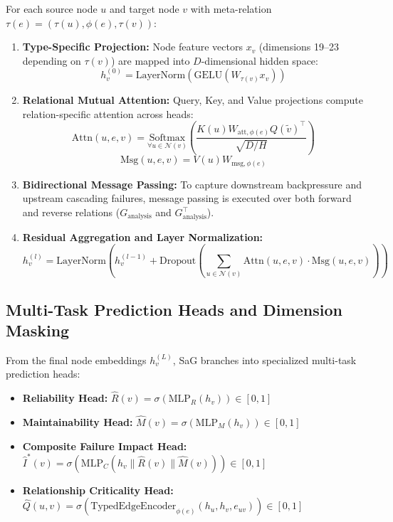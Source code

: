 For each source node $u$ and target node $v$ with meta-relation $\tau(e) = (\tau(u), \phi(e), \tau(v))$:
\begin{enumerate}
    \item \textbf{Type-Specific Projection:} Node feature vectors $x_v$ (dimensions 19--23 depending on $\tau(v)$) are mapped into $D$-dimensional hidden space:
    \begin{equation}
    h_v^{(0)} = \text{LayerNorm}(\text{GELU}(W_{\tau(v)} x_v))
    \end{equation}
    \item \textbf{Relational Mutual Attention:} Query, Key, and Value projections compute relation-specific attention across heads:
    \begin{equation}
    \text{Attn}(u, e, v) = \underset{\forall u \in \mathcal{N}(v)}{\text{Softmax}}\left( \frac{K(u) W_{\text{att},\phi(e)} Q(\tilde{v})^\top}{\sqrt{D/H}} \right)
    \end{equation}
    \begin{equation}
    \text{Msg}(u, e, v) = V(u) W_{\text{msg},\phi(e)}
    \end{equation}
    \item \textbf{Bidirectional Message Passing:} To capture downstream backpressure and upstream cascading failures, message passing is executed over both forward and reverse relations ($G_{\text{analysis}}$ and $G_{\text{analysis}}^\top$).
    \item \textbf{Residual Aggregation and Layer Normalization:}
    \begin{equation}
    h_v^{(l)} = \text{LayerNorm}\left( h_v^{(l-1)} + \text{Dropout}\left(\sum_{u \in \mathcal{N}(v)} \text{Attn}(u, e, v) \cdot \text{Msg}(u, e, v)\right)\right)
    \end{equation}
\end{enumerate}

\subsection{Multi-Task Prediction Heads and Dimension Masking}
\label{sec:5.3}

From the final node embeddings $h_v^{(L)}$, SaG branches into specialized multi-task prediction heads:
\begin{itemize}
    \item \textbf{Reliability Head:} $\hat{R}(v) = \sigma(\text{MLP}_R(h_v)) \in [0, 1]$
    \item \textbf{Maintainability Head:} $\hat{M}(v) = \sigma(\text{MLP}_M(h_v)) \in [0, 1]$
    \item \textbf{Composite Failure Impact Head:} $\hat{I}^*(v) = \sigma(\text{MLP}_C(h_v \parallel \hat{R}(v) \parallel \hat{M}(v))) \in [0, 1]$
    \item \textbf{Relationship Criticality Head:} $\hat{Q}(u,v) = \sigma(\text{TypedEdgeEncoder}_{\phi(e)}(h_u, h_v, e_{uv})) \in [0, 1]$
\end{itemize}

